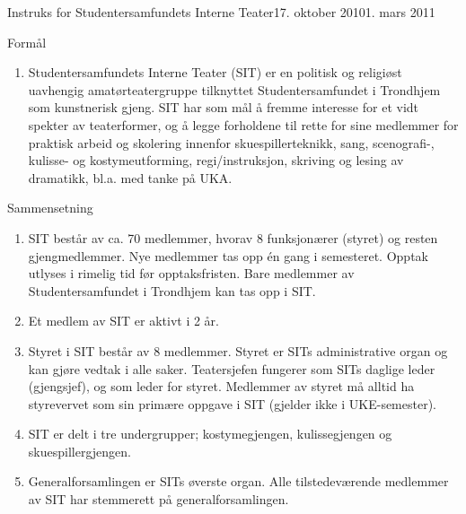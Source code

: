 \begin{instruks}{Instruks for Studentersamfundets Interne Teater}{17. oktober 2010}{1. mars 2011 }

	\begin{instruksledd}{Formål}
		\begin{enumerate}
			\item Studentersamfundets Interne Teater (SIT) er en politisk og religiøst uavhengig
				amatørteatergruppe tilknyttet Studentersamfundet i Trondhjem som kunstnerisk gjeng. SIT har som mål
				å fremme interesse for et vidt spekter av teaterformer, og å legge forholdene til rette for sine
				medlemmer for praktisk arbeid og skolering innenfor skuespillerteknikk, sang, scenografi-, kulisse-
				og kostymeutforming, regi/instruksjon, skriving og lesing av dramatikk, bl.a. med tanke på UKA.
		\end{enumerate}
	\end{instruksledd}

	\begin{instruksledd}{Sammensetning}
		\begin{enumerate}
			\item SIT består av ca. 70 medlemmer, hvorav 8 funksjonærer (styret) og resten
				gjengmedlemmer. Nye medlemmer tas opp én gang i semesteret. Opptak utlyses i rimelig tid før
				opptaksfristen. Bare medlemmer av Studentersamfundet i Trondhjem kan tas opp i SIT.
			\item Et medlem av SIT er aktivt i 2 år.
			\item Styret i SIT består av 8 medlemmer. Styret er SITs administrative organ og kan
				gjøre vedtak i alle saker. Teatersjefen fungerer som SITs daglige leder (gjengsjef), og som leder
				for styret. Medlemmer av styret må alltid ha styrevervet som sin primære oppgave i SIT (gjelder ikke
				i UKE-semester).
			\item SIT er delt i tre undergrupper; kostymegjengen, kulissegjengen og
				skuespillergjengen.
			\item  Generalforsamlingen er SITs øverste organ. Alle tilstedeværende medlemmer
				av SIT har stemmerett på generalforsamlingen.
		\end{enumerate}
	\end{instruksledd}


\end{instruks}
